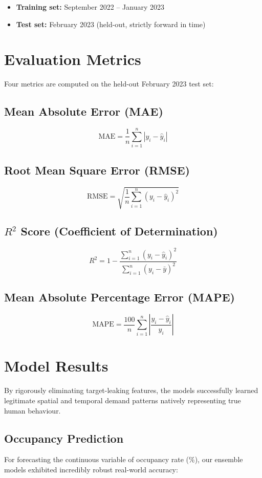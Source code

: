 \documentclass[12pt,a4paper]{article}
\begin{document}
\begin{itemize}
  \item \textbf{Training set:} September 2022 – January 2023
  \item \textbf{Test set:} February 2023 (held-out, strictly forward in time)
\end{itemize}

\section{Evaluation Metrics}

Four metrics are computed on the held-out February 2023 test set:

\subsection*{Mean Absolute Error (MAE)}
\[
\text{MAE} = \frac{1}{n}\sum_{i=1}^{n} |y_i - \hat{y}_i|
\]

\subsection*{Root Mean Square Error (RMSE)}
\[
\text{RMSE} = \sqrt{\frac{1}{n}\sum_{i=1}^{n}(y_i - \hat{y}_i)^2}
\]

\subsection*{$R^2$ Score (Coefficient of Determination)}
\[
R^2 = 1 - \frac{\sum_{i=1}^{n}(y_i - \hat{y}_i)^2}{\sum_{i=1}^{n}(y_i - \bar{y})^2}
\]

\subsection*{Mean Absolute Percentage Error (MAPE)}
\[
\text{MAPE} = \frac{100}{n} \sum_{i=1}^{n} \left| \frac{y_i - \hat{y}_i}{y_i} \right|
\]

\section{Model Results}

By rigorously eliminating target-leaking features, the models successfully learned legitimate spatial and temporal demand patterns natively representing true human behaviour.

\subsection{Occupancy Prediction}
For forecasting the continuous variable of occupancy rate (\%), our ensemble models exhibited incredibly robust real-world accuracy:
\end{document}
